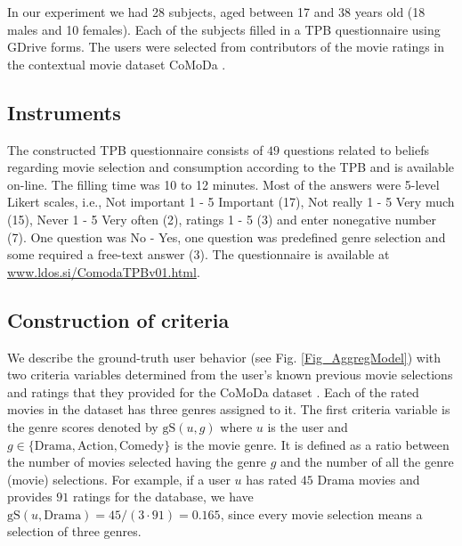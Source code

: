 \documentclass{llncs}
\def\gS{{\mbox{gS}}}
\begin{document}
In our experiment we had 28 subjects, aged between 17 and 38 years old (18 males and 10 females). Each of the subjects filled in a TPB questionnaire using GDrive forms. The users were selected from contributors of the movie ratings in the contextual movie dataset CoMoDa  \cite{CoMoDa2009}.


\subsection{Instruments}\label{SubSec_Instrum}

The constructed TPB questionnaire consists of $49$ questions related to beliefs regarding movie selection and consumption according to the TPB and is available on-line. The filling time was 10 to 12 minutes. Most of the answers were 5-level Likert scales, i.e., Not important 1 - 5 Important (17), Not really 1 - 5 Very much (15), Never 1 - 5 Very often (2), ratings 1 - 5 (3) and enter nonegative number (7). One question was No - Yes, one question was predefined genre selection and some required a free-text answer (3).  The questionnaire is available at \url{www.ldos.si/ComodaTPBv01.html}. 


\subsection{Construction of criteria}\label{SubSec_CritConstr}

We describe the ground-truth user behavior (see Fig. \ref{Fig_AggregModel}) with two criteria variables determined from the user’s known previous movie selections and ratings that they provided for the CoMoDa dataset \cite{CoMoDa2009}. Each of the rated movies in the dataset has three genres assigned to it. The first criteria variable is the genre scores denoted by $\gS(u, g)$ where $u$ is the user and $g\in\{\mbox{Drama}, \mbox{Action}, \mbox{Comedy}\}$ is the movie genre. It is defined as a ratio between the number of movies selected having the genre $g$ and the number of all the genre (movie) selections. For example, if a user $u$ has rated $45$ Drama movies and provides $91$ ratings for the database, we have $\gS(u, \mbox{Drama}) = 45/(3\cdot91)=0.165$, since every movie selection means a selection of three genres. 
\end{document}
